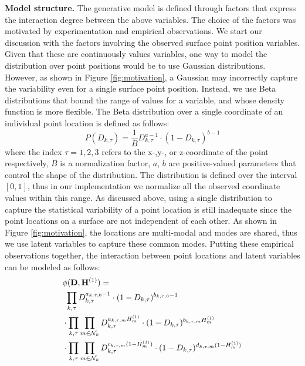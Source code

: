 \textbf{Model structure.} The generative model is defined through factors that express the interaction degree between the above variables.  The choice of the factors was motivated by experimentation and empirical observations. We start our discussion with the factors involving the observed surface point position variables. Given that these are continuously values variables, one way to model the distribution over point positions would be to use Gaussian distributions. However, as shown in Figure \ref{fig:motivation}, a Gaussian may incorrectly capture the variability even for a single surface point position. Instead, we use Beta distributions that bound the range of values for a variable, and whose density function is more flexible. 
The Beta distribution over a single coordinate of an individual point location is defined as follows:
\begin{equation*}
P( D_{k,\tau} ) = \frac{1}{B} D_{k,\tau}^{a-1} \cdot (1 - D_{k,\tau})^{b-1}
\end{equation*}
where the index $\tau=1,2,3$ refers to the x-,y-, or z-coordinate of the point respectively, $B$ is a normalization factor, $a$, $b$ are positive-valued parameters that control the shape of the distribution. The distribution is defined over the interval $[0, 1]$, thus in our implementation we normalize all the observed coordinate values within this range. As discussed above, using a single distribution to capture the statistical variability of a point location is still inadequate since the point locations on a surface are not independent of each other. As shown in Figure \ref{fig:motivation}, the locations are multi-modal and modes are shared, thus we use latent variables to capture these common modes. Putting these empirical observations together, the interaction between point locations and latent variables can be modeled as follows: 
\begin{align*}
& \phi( \mathbf{D}, \mathbf{H}^{(1)}) = 
\nonumber \\
& \,\, \prod \limits_{k,\tau} D_{k,\tau}^{a_{k,\tau,0}-1} \cdot (1 - D_{k,\tau})^{b_{k,\tau,0}-1} 
\nonumber \\
& \cdot \prod \limits_{k,\tau} \prod\limits_{m \in \mathcal{N}_k} D_{k,\tau}^{a_{k,\tau,m} H_m^{(1)}} \cdot (1 - D_{k,\tau})^{b_{k,\tau,m} H_m^{(1)}} 
\nonumber \\
& \cdot \prod \limits_{k,\tau} \prod\limits_{m \in \mathcal{N}_k} D_{k,\tau}^{c_{k,\tau,m} (1-H_m^{(1)})} \cdot (1 - D_{k,\tau})^{d_{k,\tau,m} (1-H_m^{(1)})}
\end{align*}
